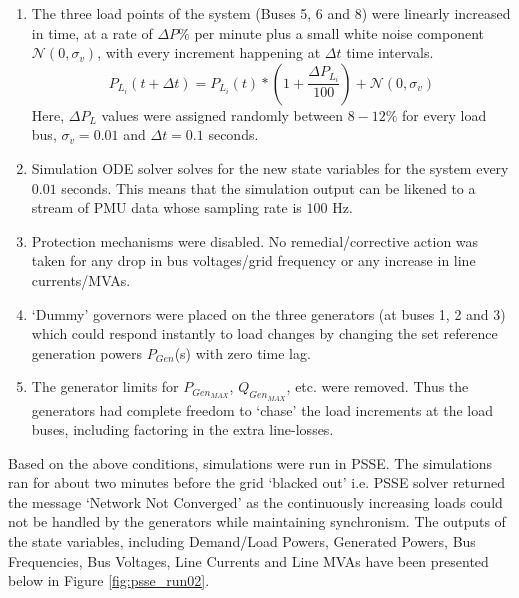 \begin{enumerate}
	\item The three load points of the system (Buses 5, 6 and 8) were linearly increased in time, at a rate of $\Delta P \%$ per minute plus a small white noise component $\mathcal{N}(0, \sigma_v)$, with every increment happening at $\Delta t$ time intervals. 
	\begin{equation}
		P_{L_i}(t+\Delta t) = P_{L_i}(t)*\left(1+ \frac{\Delta P_{L_i}}{100}\right) + \mathcal{N}(0, \sigma_v)
	\end{equation} 
	Here, $\Delta P_{L}$ values were assigned randomly between $8-12\%$ for every load bus, $\sigma_v = 0.01$ and $\Delta t = 0.1$ seconds.
	\item Simulation ODE solver solves for the new state variables for the system every $0.01$ seconds. This means that the simulation output can be likened to a stream of PMU data whose sampling rate is $100$ Hz.
	\item Protection mechanisms were disabled. No remedial/corrective action was taken for any drop in bus voltages/grid frequency or any increase in line currents/MVAs.
	\item `Dummy' governors were placed on the three generators (at buses 1, 2 and 3) which could respond instantly to load changes by changing the set reference generation powers $P_{Gen}$(s) with zero time lag.
	\item The generator limits for $P_{Gen_{MAX}}$, $Q_{Gen_{MAX}}$, etc. were removed. Thus the generators had complete freedom to `chase' the load increments at the load buses, including factoring in the extra line-losses.
\end{enumerate} 

Based on the above conditions, simulations were run in PSSE. The simulations ran for about two minutes before the grid `blacked out' i.e. PSSE solver returned the message `Network Not Converged' as the continuously increasing loads could not be handled by the generators while maintaining synchronism. The outputs of the state variables, including Demand/Load Powers, Generated Powers, Bus Frequencies, Bus Voltages, Line Currents and Line MVAs have been presented below in Figure \ref{fig:psse_run02}.

